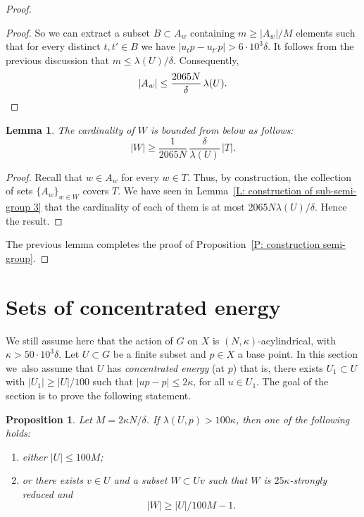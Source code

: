 \documentclass[11pt]{article}
\theoremstyle{plain}
\newtheorem{prop}[thm]{Proposition}
\newtheorem{lem}[thm]{Lemma}
\theoremstyle{definition}
\begin{document}
\begin{proof}
\begin{proof}
So we can extract a subset $B \subset A_w$ containing $m \geq |A_w| / M$ elements such that for every distinct $t,t' \in B$ we have $|u_tp - u_{t'}p| > 6\cdot 10^3\delta$.
It follows from the previous discussion that $m \leq \lambda(U) / \delta$.
Consequently,
\begin{equation*}
|A_w| \leq \frac{2065N}{\delta}\, \lambda(U). \qedhere
\end{equation*}
\end{proof}

\begin{lem}\label{L: construction of sub-semi-group 6}
The cardinality of $W$ is bounded from below as follows:
\[
|W|\geqslant \frac 1{2065N}\,\frac \delta{\lambda(U)}\, |T|.
\]
\end{lem}

\begin{proof}
Recall that $w \in A_w$ for every $w \in T$.
Thus, by construction, the collection of sets $\{A_w\}_{w \in W}$ covers $T$.
We have seen in Lemma~\ref{L: construction of sub-semi-group 3} that the cardinality of each of them is at most $2065N\lambda(U)/\delta$.
Hence the result.
\end{proof}

The previous lemma completes the proof of Proposition~\ref{P: construction semi-group}.
\end{proof}

\section{Sets of concentrated energy}
We still assume here that the action of $G$ on $X$ is $(N, \kappa)$-acylindrical, with $\kappa > 50\cdot 10^3\delta$.
Let $U\subset G$ be a finite subset and $p \in X$ a base point.
In this section we~also assume that $U$ has \emph{concentrated energy} (at $p$) that is, there exists $U_1 \subset U$ with $|U_1| \geq |U|/100$ such that $|up-p|\leqslant 2\kappa$, for all $u\in U_1$.
The goal of the section is to prove the following statement.

\begin{prop}\label{P: main concentrated}
Let $M =2\kappa N/ \delta$.
If $\lambda(U,p)> 100\kappa$, then one of the following holds:
\begin{enumerate}
\item either $ |U| \leq 100M$;
\item or there exists $v \in U$ and a subset $W \subset Uv$ such that $W$ is $25\kappa$-strongly reduced and
\[
|W| \geq |U|/100M - 1.
\]
\end{enumerate}
\end{prop}
\end{document}
